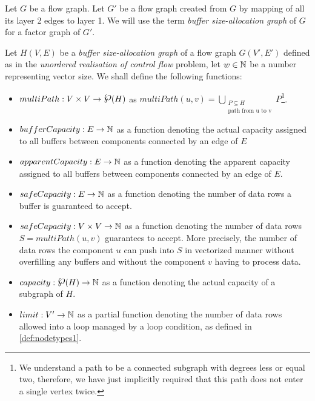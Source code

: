  Let $G$ be a flow graph. Let $G'$ be a flow graph created from $G$ by mapping of all its layer 2 edges to layer 1.
      We will use the term \emph{buffer size-allocation graph} of $G$ for a factor graph of $G'$.
\myenddef


      Let $H(V,E)$ be a \emph{buffer size-allocation graph} of a flow graph $G(V',E')$ defined as in the \emph{unordered realisation of control flow} problem, let $w \in \mathbb{N}$ be a number representing vector size. We shall define the following functions:
  \begin{itemize}
    \item $multiPath: V \times V \arrow \powerset (H)$ as $multiPath(u,v) = \bigcup_{\substack{P \subseteq H \\ \text{path from u to v}}} P$\footnote{We understand a path to be a connected subgraph with degrees less or equal two, therefore, we have just implicitly required that this path does not enter a single vertex twice.}.
    \item $bufferCapacity: E \rightarrow \mathbb{N}$ as a function denoting the actual capacity assigned to all buffers between components connected by an edge of $E$ 
    \item $apparentCapacity: E \rightarrow \mathbb{N}$ as a function denoting the apparent capacity assigned to all buffers between components connected by an edge of $E$.
    \item $safeCapacity: E \rightarrow \mathbb{N}$ as a function denoting the number of data rows a buffer is guaranteed to accept.
    \item $safeCapacity: V \times V \rightarrow \mathbb{N}$ as a function denoting the number of data rows $S = multiPath(u,v)$ guarantees to accept. More precisely, the number of data rows the component $u$ can push into $S$ in vectorized manner without overfilling any buffers and without the component $v$ having to process data. 
    \item $capacity: \powerset(H) \arrow \N$ as a function denoting the actual capacity of a subgraph of $H$.
    \item $limit: V' \rightarrow \mathbb{N}$ as a partial function denoting the number of data rows allowed into a loop managed by a loop condition, as defined in \ref{def:nodetypes1}.
  \end{itemize}



